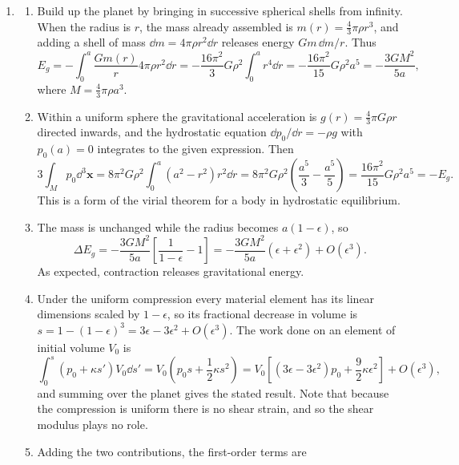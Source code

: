 \documentclass[a4paper,10pt]{paper}
\begin{document}
\begin{enumerate}
\item
\begin{enumerate}
\item Build up the planet by bringing in successive spherical shells from infinity. When the radius is $r$, the mass already
assembled is $m(r)=\tfrac{4}{3}\pi\rho r^{3}$, and adding a shell of mass $\dd m=4\pi\rho r^{2}\dd r$ releases energy $Gm\,\dd m/r$. Thus
\begin{equation*}
    E_{g}=-\int_{0}^{a}\frac{Gm(r)}{r}4\pi\rho r^{2}\dd r=-\frac{16\pi^{2}}{3}G\rho^{2}\int_{0}^{a}r^{4}\dd r=-\frac{16\pi^{2}}{15}G\rho^{2}a^{5}
    =-\frac{3GM^{2}}{5a},
\end{equation*}
where $M=\tfrac{4}{3}\pi\rho a^{3}$.
\item Within a uniform sphere the gravitational acceleration is $g(r)=\tfrac{4}{3}\pi G\rho r$ directed inwards, and the
hydrostatic equation $\dd p_{0}/\dd r=-\rho g$ with $p_{0}(a)=0$ integrates to the given expression. Then
\begin{equation*}
    3\int_{M}p_{0}\dd^{3}\mathbf{x}=8\pi^{2}G\rho^{2}\int_{0}^{a}(a^{2}-r^{2})r^{2}\dd r=8\pi^{2}G\rho^{2}\left(\frac{a^{5}}{3}-\frac{a^{5}}{5}\right)
    =\frac{16\pi^{2}}{15}G\rho^{2}a^{5}=-E_{g}.
\end{equation*}
This is a form of the virial theorem for a body in hydrostatic equilibrium.
\item The mass is unchanged while the radius becomes $a(1-\epsilon)$, so
\begin{equation*}
    \Delta E_{g}=-\frac{3GM^{2}}{5a}\left[\frac{1}{1-\epsilon}-1\right]=-\frac{3GM^{2}}{5a}(\epsilon+\epsilon^{2})+O(\epsilon^{3}).
\end{equation*}
As expected, contraction releases gravitational energy.
\item Under the uniform compression every material element has its linear dimensions scaled by $1-\epsilon$, so its
fractional decrease in volume is $s=1-(1-\epsilon)^{3}=3\epsilon-3\epsilon^{2}+O(\epsilon^{3})$. The work done on an element of
initial volume $V_{0}$ is
\begin{equation*}
    \int_{0}^{s}(p_{0}+\kappa s')V_{0}\dd s'=V_{0}\left(p_{0}s+\frac{1}{2}\kappa s^{2}\right)
    =V_{0}\left[(3\epsilon-3\epsilon^{2})p_{0}+\frac{9}{2}\kappa\epsilon^{2}\right]+O(\epsilon^{3}),
\end{equation*}
and summing over the planet gives the stated result. Note that because the compression is uniform there is no shear strain, and
so the shear modulus plays no role.
\item Adding the two contributions, the first-order terms are

\end{enumerate}
\end{enumerate}
\end{document}

